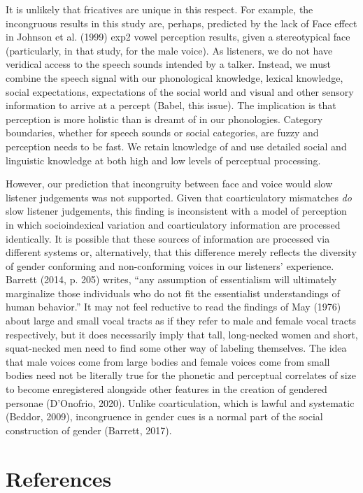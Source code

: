 \documentclass[
  letterpaper,
  DIV=11,
  numbers=noendperiod]{scrartcl}
\begin{document}
It is unlikely that fricatives are unique in this respect. For example,
the incongruous results in this study are, perhaps, predicted by the
lack of Face effect in Johnson et al. (1999) exp2 vowel perception
results, given a stereotypical face (particularly, in that study, for
the male voice). As listeners, we do not have veridical access to the
speech sounds intended by a talker. Instead, we must combine the speech
signal with our phonological knowledge, lexical knowledge, social
expectations, expectations of the social world and visual and other
sensory information to arrive at a percept (Babel, this issue). The
implication is that perception is more holistic than is dreamt of in our
phonologies. Category boundaries, whether for speech sounds or social
categories, are fuzzy and perception needs to be fast. We retain
knowledge of and use detailed social and linguistic knowledge at both
high and low levels of perceptual processing.

However, our prediction that incongruity between face and voice would
slow listener judgements was not supported. Given that coarticulatory
mismatches \emph{do} slow listener judgements, this finding is
inconsistent with a model of perception in which socioindexical
variation and coarticulatory information are processed identically. It
is possible that these sources of information are processed via
different systems or, alternatively, that this difference merely
reflects the diversity of gender conforming and non-conforming voices in
our listeners' experience. Barrett (2014, p. 205) writes, ``any
assumption of essentialism will ultimately marginalize those individuals
who do not fit the essentialist understandings of human behavior.'' It
may not feel reductive to read the findings of May (1976) about large
and small vocal tracts as if they refer to male and female vocal tracts
respectively, but it does necessarily imply that tall, long-necked women
and short, squat-necked men need to find some other way of labeling
themselves. The idea that male voices come from large bodies and female
voices come from small bodies need not be literally true for the
phonetic and perceptual correlates of size to become enregistered
alongside other features in the creation of gendered personae
(D'Onofrio, 2020). Unlike coarticulation, which is lawful and systematic
(Beddor, 2009), incongruence in gender cues is a normal part of the
social construction of gender (Barrett, 2017).

\section*{References}\label{sec-references}
\end{document}
